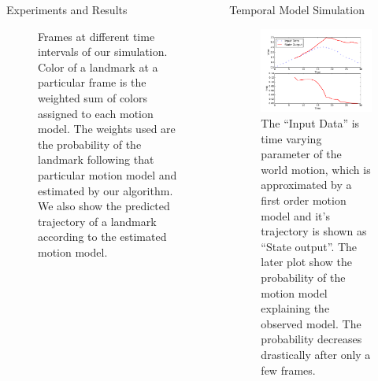 \documentclass[final]{beamer}
\newlength{\sepwid}
\newlength{\onecolwid}
\begin{document}
\begin{frame}[t]
\begin{columns}[t]
\begin{column}{\onecolwid}
      \begin{block}{Experiments and Results}
        \begin{figure}
          \newlength{\imgwidth}
          \setlength{\imgwidth}{\textwidth}
          \centering
          \tikzset{/tikz/x=0.08\linewidth}
          \tikzset{/tikz/y=0.08\linewidth}
          \caption{ Frames at different time intervals of our simulation.
      Color of a landmark at a particular frame is the weighted sum of colors
      assigned to each motion model. The weights used are the probability of the
    landmark following that particular motion model and estimated by our algorithm. We also show the predicted trajectory of a landmark according to the estimated motion model.}
          \label{fig:graphmodel}
        \end{figure}
      \end{block}

      
    \end{column}


  \hspace{-\sepwid}
    \begin{column}{\onecolwid}

      \begin{block}{Temporal Model Simulation}
        \centering
          \begin{figure}
            \includegraphics[width=1.0\onecolwid]{media/temporal_model.pdf}
            \caption{The ``Input Data'' is time varying parameter of the world
            motion, which is approximated by a first order motion model and
          it's trajectory is shown as ``State output''. The later plot show the
        probability of the motion model explaining the observed model. The
      probability decreases drastically after only a few frames.}
          \end{figure}
      \end{block}


\end{column}
\end{columns}
\end{frame}
\end{document}
